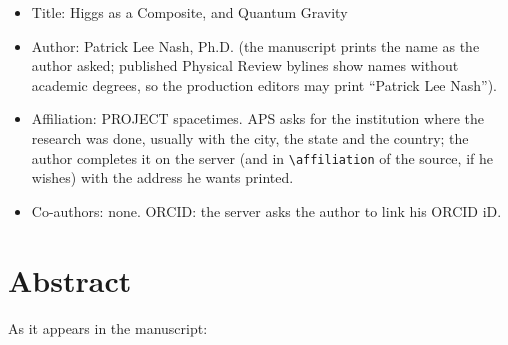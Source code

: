 \documentclass[11pt]{article}
\begin{document}
\begin{itemize}
\item Title: Higgs as a Composite, and Quantum Gravity
\item Author: Patrick Lee Nash, Ph.D. (the manuscript prints the name as the author asked; published Physical Review
bylines show names without academic degrees, so the production editors may print ``Patrick Lee Nash'').
\item Affiliation: PROJECT spacetimes. APS asks for the institution where the research was done, usually with the city,
the state and the country; the author completes it on the server (and in \texttt{\textbackslash affiliation} of the
source, if he wishes) with the address he wants printed.
\item Co-authors: none. ORCID: the server asks the author to link his ORCID iD.
\end{itemize}

\section{Abstract}
\label{sec:abstract}

As it appears in the manuscript:
\end{document}

